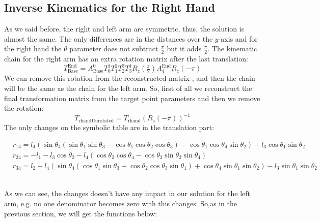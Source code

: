\subsection{Inverse Kinematics for the Right Hand}
As we said before, the right and left arm are symmetric, thus, the solution is almost the same. The only differences are in the distances over the \(y\)-axis and for the right hand the \(\theta\) parameter does not subtract $\frac{\pi}{2}$ but it adds $\frac{\pi}{2}$. The kinematic chain for the right arm has an extra rotation matrix after the last translation:
\[
T^\text{End}_\text{Base} = A^0_\text{Base}T^1_0T^2_1T^3_2T^4_3R_z(\tfrac{\pi}{2})A^\text{End}_{4}R_z(-\pi)
\]
We can remove this rotation from the reconstructed matrix , and then the chain will be the same as the chain for the left arm. So, first of all we reconstruct the final transformation matrix from the target point parameters and then we remove the rotation:
\[
T_\text{rhandUnrotated} = T_\text{rhand}{\left(R_z(-\pi)\right)}^{-1}
\]
The only changes on the symbolic table are in the translation part:

\begin{small}
\begin{align*}
&r_{14} = l_4\left(\sin\theta_4\left(\sin\theta_1\sin\theta_3 - \cos\theta_1\cos\theta_2\cos\theta_3\right) - \cos\theta_1\cos\theta_4\sin\theta_2\right) + l_3\cos\theta_1\sin\theta_2\\
&r_{24} = -l_1 - l_3\cos\theta_2 - l_4\left(\cos\theta_2\cos\theta_4 - \cos\theta_3\sin\theta_2\sin\theta_4\right)\\
&r_{34} = l_2 - l_4\left(\sin\theta_4\left(\cos\theta_1\sin\theta_3 + \cos\theta_2\cos\theta_3\sin\theta_1\right) + \cos\theta_4\sin\theta_1\sin\theta_2\right) - l_3\sin\theta_1\sin\theta_2
\end{align*}
\end{small}\\
As we can see, the changes doesn't have any impact in our solution for the left arm, e.g. no one denominator becomes zero with this changes. So,as in the previous section, we will get the functions below:

